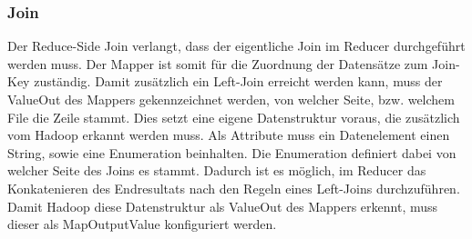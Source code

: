 \documentclass[a4paper,10pt,titlepage=false]{scrreprt}
\begin{document}
\subsubsection{Join}
Der Reduce-Side Join verlangt, dass der eigentliche Join im Reducer durchgeführt werden muss. Der Mapper ist somit für die Zuordnung der Datensätze zum Join-Key zuständig. Damit zusätzlich ein Left-Join erreicht werden kann, muss der ValueOut des Mappers gekennzeichnet werden, von welcher Seite, bzw. welchem File die Zeile stammt. Dies setzt eine eigene Datenstruktur voraus, die zusätzlich vom Hadoop erkannt werden muss. Als Attribute muss ein Datenelement einen String, sowie eine Enumeration beinhalten. Die Enumeration definiert dabei von welcher Seite des Joins es stammt. Dadurch ist es möglich, im Reducer das Konkatenieren des Endresultats nach den Regeln eines Left-Joins durchzuführen. Damit Hadoop diese Datenstruktur als ValueOut des Mappers erkennt, muss dieser als MapOutputValue konfiguriert werden.
\end{document}

